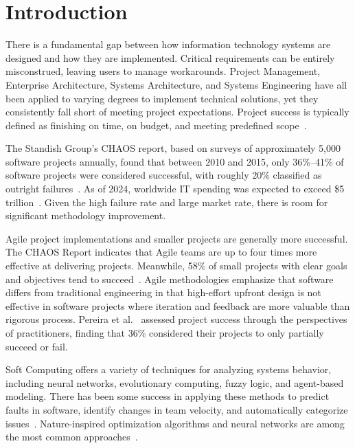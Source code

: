 \documentclass[preprint,12pt]{elsarticle}
\begin{document}
\section{Introduction}

There is a fundamental gap between how information technology systems are designed and how they are implemented. Critical requirements can be entirely misconstrued, leaving users to manage workarounds. Project Management, Enterprise Architecture, Systems Architecture, and Systems Engineering have all been applied to varying degrees to implement technical solutions, yet they consistently fall short of meeting project expectations. Project success is typically defined as finishing on time, on budget, and meeting predefined scope~\cite{loureiro2024}.

The Standish Group's CHAOS report, based on surveys of approximately 5,000 software projects annually, found that between 2010 and 2015, only 36\%--41\% of software projects were considered successful, with roughly 20\% classified as outright failures~\cite{standish2015}. As of 2024, worldwide IT spending was expected to exceed \$5 trillion~\cite{gartner2024}. Given the high failure rate and large market rate, there is room for significant methodology improvement. 

Agile project implementations and smaller projects are generally more successful. The CHAOS Report indicates that Agile teams are up to four times more effective at delivering projects. Meanwhile, 58\% of small projects with clear goals and objectives tend to succeed~\cite{sandle2020}. Agile methodologies emphasize that software differs from traditional engineering in that high-effort upfront design is not effective in software projects where iteration and feedback are more valuable than rigorous process. Pereira et al.~\cite{pereira2021} assessed project success through the perspectives of practitioners, finding that 36\% considered their projects to only partially succeed or fail.

Soft Computing offers a variety of techniques for analyzing systems behavior, including neural networks, evolutionary computing, fuzzy logic, and agent-based modeling. There has been some success in applying these methods to predict faults in software, identify changes in team velocity, and automatically categorize issues~\cite{afzal2011, mahdi2021, pospieszny2018, petkovic2016, zhang2003}. Nature-inspired optimization algorithms and neural networks are among the most common approaches~\cite{mahajan2022, siva2023a, sarro2021, siva2023b}.
\end{document}

